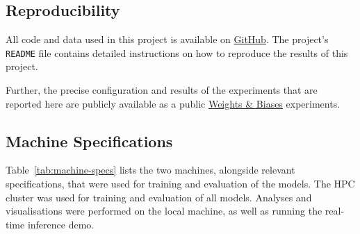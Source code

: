 \documentclass[a4paper]{article}
\begin{document}
\subsection{Reproducibility} %
\label{sub:reproducibility}

All code and data used in this project is available on
\href{https://github.com/mikasenghaas/bsc}{GitHub}. The project's
\texttt{README} file contains detailed instructions on how to reproduce the
results of this project.

Further, the precise configuration and results of the experiments that are
reported here are publicly available as a public
\href{https://wandb.ai/mikasenghaas/bsc}{Weights \& Biases} experiments.


\subsection{Machine Specifications} %
\label{sub:machine-specs}

Table~\ref{tab:machine-specs} lists the two machines, alongside relevant
specifications, that were used for training and evaluation of the models.
The HPC cluster was used for training and evaluation of all models. Analyses
and visualisations were performed on the local machine, as well as running the
real-time inference demo. 
\end{document}
